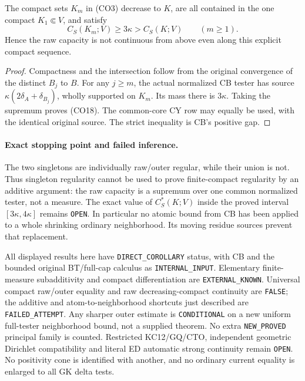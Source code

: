 \begin{corollary}
The compact sets $K_m$ in (CO3) decrease to $K$, are all contained
in the one compact $K_1\Subset V$, and satisfy
\[
                  C_S(K_m;V)\ge3\kappa
                       >C_S(K;V)\qquad(m\ge1).
 \tag{CO18}
\]
Hence the raw capacity is not continuous from above even along
this explicit compact sequence.
\end{corollary}

\begin{proof}
Compactness and the intersection follow from the original
convergence of the distinct $B_j$ to $B$. For any $j\ge m$,
the actual normalized CB tester has source
$\kappa(2\delta_A+\delta_{B_j})$, wholly supported on $K_m$.
Its mass there is $3\kappa$. Taking the supremum proves (CO18).
The common-core CY row may equally be used, with the identical
original source. The strict inequality is CB's positive gap.
\end{proof}

\paragraph{Exact stopping point and failed inference.}
The two singletons are individually raw/outer regular, while their
union is not. Thus singleton regularity cannot be used to prove
finite-compact regularity by an additive argument: the raw capacity
is a supremum over one common normalized tester, not a measure.
The exact value of $C_S^*(K;V)$ inside the proved interval
$[3\kappa,4\kappa]$ remains \texttt{OPEN}.
In particular no atomic bound from CB has been applied to a
whole shrinking ordinary neighborhood. Its moving residue sources
prevent that replacement.

All displayed results here have \texttt{DIRECT\_COROLLARY} status,
with CB and the bounded original BT/full-cap calculus as
\texttt{INTERNAL\_INPUT}. Elementary finite-measure subadditivity
and compact differentiation are \texttt{EXTERNAL\_KNOWN}.
Universal compact raw/outer equality and raw decreasing-compact
continuity are \texttt{FALSE}; the additive and atom-to-neighborhood
shortcuts just described are \texttt{FAILED\_ATTEMPT}.
Any sharper outer estimate is \texttt{CONDITIONAL} on a new
uniform full-tester neighborhood bound, not a supplied theorem.
No extra \texttt{NEW\_PROVED} principal family is counted.
Restricted KC12/GQ/CTO, independent geometric Dirichlet
compatibility and literal ED automatic strong continuity remain
\texttt{OPEN}. No positivity cone is identified with another,
and no ordinary current equality is enlarged to all GK delta tests.
